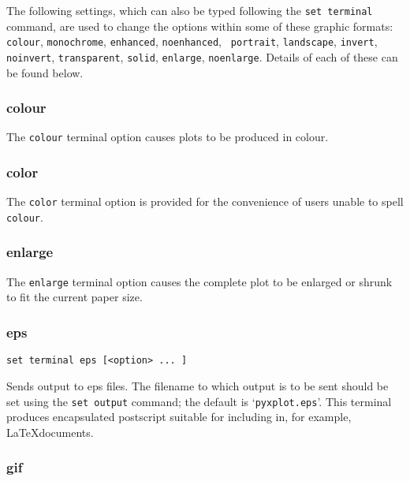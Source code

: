 \documentclass[a4paper,onecolumn,11pt]{book}
\begin{document}
The following settings, which can also be typed following the {\tt set terminal}
command, are used to change the options within some of these graphic formats:
{\tt colour}, {\tt monochrome}, {\tt enhanced}, {\tt noenhanced}, {\tt
portrait}, {\tt landscape}, {\tt invert}, {\tt noinvert}, {\tt transparent},
{\tt solid}, {\tt enlarge}, {\tt noenlarge}. Details of each of these can be
found below.

\subsubsection{colour}

The {\tt colour} terminal option causes plots to be produced in colour.

\subsubsection{color}

The {\tt color} terminal option is provided for the convenience of users unable
to spell {\tt colour}.

\subsubsection{enlarge}

The {\tt enlarge} terminal option causes the complete plot to be enlarged or
shrunk to fit the current paper size.

\subsubsection{eps}

\begin{verbatim}
set terminal eps [<option> ... ]
\end{verbatim}

Sends output to eps files.  The filename to which output is to be sent should be
set using the {\tt set output} command; the default is `\texttt{pyxplot.eps}'.  This
terminal produces encapsulated postscript suitable for including in, for
example, \LaTeX documents.


\subsubsection{gif}
\end{document}
